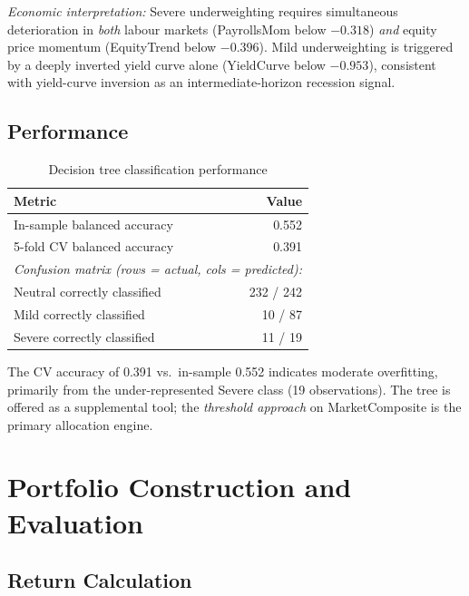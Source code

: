 \documentclass[11pt, a4paper]{article}
\begin{document}
\textit{Economic interpretation:} Severe underweighting requires simultaneous
deterioration in \emph{both} labour markets (PayrollsMom below $-0.318$)
\emph{and} equity price momentum (EquityTrend below $-0.396$). Mild
underweighting is triggered by a deeply inverted yield curve alone
(YieldCurve below $-0.953$), consistent with yield-curve inversion as an
intermediate-horizon recession signal.

\subsection{Performance}

\begin{table}[H]
\centering
\caption{Decision tree classification performance}
\begin{tabular}{lr}
\toprule
\textbf{Metric} & \textbf{Value} \\
\midrule
In-sample balanced accuracy    & 0.552 \\
5-fold CV balanced accuracy    & 0.391 \\
\midrule
\multicolumn{2}{l}{\textit{Confusion matrix (rows = actual, cols = predicted):}} \\
\midrule
Neutral correctly classified   & 232 / 242 \\
Mild correctly classified      &  10 / 87  \\
Severe correctly classified    &  11 / 19  \\
\bottomrule
\end{tabular}
\end{table}

The CV accuracy of 0.391 vs.\ in-sample 0.552 indicates moderate overfitting,
primarily from the under-represented Severe class (19 observations). The tree
is offered as a supplemental tool; the \emph{threshold approach} on
MarketComposite is the primary allocation engine.

\section{Portfolio Construction and Evaluation}
\label{sec:portfolio}

\subsection{Return Calculation}
\end{document}
